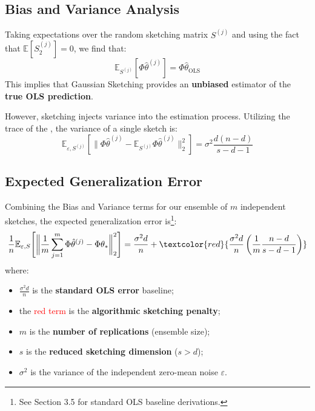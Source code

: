 \documentclass[
11pt,notheorems,hyperref={pdfauthor=whatever}
]{beamer}
\begin{document}
\subsection{Bias and Variance Analysis}
\begin{frame}
    Taking expectations over the random sketching matrix \(S^{(j)}\) and using the fact that \(\mathbb{E}[S_2^{(j)}] = 0\), we find that:
    \[
        \mathbb{E}_{S^{(j)}}[\Phi\hat{\theta}^{(j)}] = \Phi\hat{\theta}_{\text{OLS}}
    \]
    This implies that Gaussian Sketching provides an \alert{\textbf{unbiased}} estimator of the \alert{\textbf{true OLS prediction}}.

    However, sketching injects variance into the estimation process. Utilizing the trace of the , the variance of a single sketch is:
    \[
        \mathbb{E}_{\varepsilon, S^{(j)}}\left[ \big\|\Phi\hat{\theta}^{(j)} - \mathbb{E}_{S^{(j)}}\Phi\hat{\theta}^{(j)}\big\|_2^2 \right] = \sigma^2 \frac{d(n-d)}{s-d-1}
    \]
\end{frame}

\subsection{Expected Generalization Error}
\begin{frame}
    Combining the Bias and Variance terms for our ensemble of \(m\) independent sketches, the expected generalization error is\footnote{See Section 3.5 for standard OLS baseline derivations.}:
    \[
        \frac{1}{n} \mathbb{E}_{\varepsilon, S} \Bigg[ \bigg\| \frac{1}{m} \sum_{j=1}^m \Phi\hat{\theta}^{(j)} - \Phi\theta_* \bigg\|_2^2 \Bigg] = \frac{\sigma^2 d}{n} + \textcolor{red}{\frac{\sigma^2 d}{n}\left(\frac{1}{m}\frac{n-d}{s-d-1}\right)}
    \]
    where:
    \begin{itemize}
        \item \(\frac{\sigma^2 d}{n}\) is the \alert{\textbf{standard OLS error}} baseline;
        \item the \textcolor{red}{red term} is the \alert{\textbf{algorithmic sketching penalty}};
        \item \(m\) is the \alert{\textbf{number of replications}} (ensemble size);
        \item \(s\) is the \alert{\textbf{reduced sketching dimension}} (\(s > d\));
        \item \(\sigma^2\) is the variance of the independent zero-mean noise \(\varepsilon\).
    \end{itemize}
\end{frame}
\end{document}
